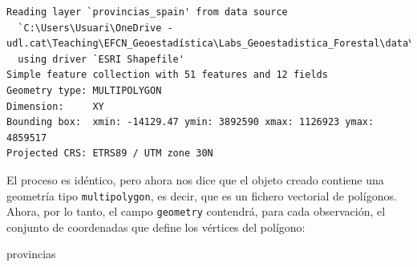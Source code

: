 \documentclass[
  letterpaper,
  DIV=11,
  numbers=noendperiod]{scrreprt}
\newenvironment{Shaded}{\begin{snugshade}}{\end{snugshade}}
\newcommand{\NormalTok}[1]{\textcolor[rgb]{0.00,0.23,0.31}{#1}}
\begin{document}
\begin{verbatim}
Reading layer `provincias_spain' from data source 
  `C:\Users\Usuari\OneDrive - udl.cat\Teaching\EFCN_Geoestadística\Labs_Geoestadistica_Forestal\data\meteo\meteo_espacial\provincias_spain.shp' 
  using driver `ESRI Shapefile'
Simple feature collection with 51 features and 12 fields
Geometry type: MULTIPOLYGON
Dimension:     XY
Bounding box:  xmin: -14129.47 ymin: 3892590 xmax: 1126923 ymax: 4859517
Projected CRS: ETRS89 / UTM zone 30N
\end{verbatim}

El proceso es idéntico, pero ahora nos dice que el objeto creado
contiene una geometría tipo \texttt{multipolygon}, es decir, que es un
fichero vectorial de polígonos. Ahora, por lo tanto, el campo
\texttt{geometry} contendrá, para cada observación, el conjunto de
coordenadas que define los vértices del polígono:

\begin{Shaded}
\begin{Highlighting}[]
\NormalTok{provincias}
\end{Highlighting}
\end{Shaded}
\end{document}

